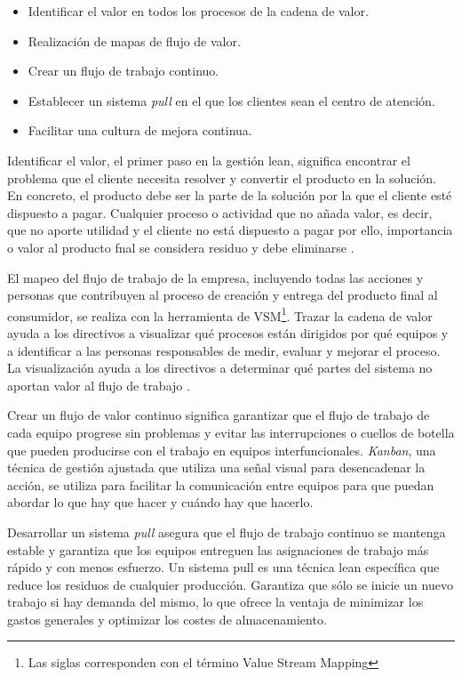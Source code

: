 \begin{itemize}
    \item Identificar el valor en todos los procesos de la cadena de valor.
    \item Realización de mapas de flujo de valor.
    \item Crear un flujo de trabajo continuo.
    \item Establecer un sistema \textit{pull} en el que los clientes sean el centro de atención.
    \item Facilitar una cultura de mejora continua.
\end{itemize}

Identificar el valor, el primer paso en la gestión lean, significa encontrar el problema que el cliente necesita resolver y convertir el producto en la solución.
En concreto, el producto debe ser la parte de la solución por la que el cliente esté dispuesto a pagar.
Cualquier proceso o actividad que no añada valor, es decir, que no aporte utilidad y el cliente no está dispuesto a pagar por ello, importancia o valor al producto fnal se considera residuo y debe eliminarse \cite{liker_toyota_2006}.

El mapeo del flujo de trabajo de la empresa, incluyendo todas las acciones y personas que contribuyen al proceso de creación y entrega del producto final al consumidor, se realiza con la herramienta de VSM\footnote{Las siglas corresponden con el término Value Stream Mapping}.
Trazar la cadena de valor ayuda a los directivos a visualizar qué procesos están dirigidos por qué equipos y a identificar a las personas responsables de medir, evaluar y mejorar el proceso.
La visualización ayuda a los directivos a determinar qué partes del sistema no aportan valor al flujo de trabajo \cite{slack_operations_2010}.

Crear un flujo de valor continuo significa garantizar que el flujo de trabajo de cada equipo progrese sin problemas y evitar las interrupciones o cuellos de botella que pueden producirse con el trabajo en equipos interfuncionales.
\textit{Kanban}, una técnica de gestión ajustada que utiliza una señal visual para desencadenar la acción, se utiliza para facilitar la comunicación entre equipos para que puedan abordar lo que hay que hacer y cuándo hay que hacerlo.

Desarrollar un sistema \textit{pull} asegura que el flujo de trabajo continuo se mantenga estable y garantiza que los equipos entreguen las asignaciones de trabajo más rápido y con menos esfuerzo. Un sistema pull es una técnica lean específica que reduce los residuos de cualquier producción. Garantiza que sólo se inicie un nuevo trabajo si hay demanda del mismo, lo que ofrece la ventaja de minimizar los gastos generales y optimizar los costes de almacenamiento.

